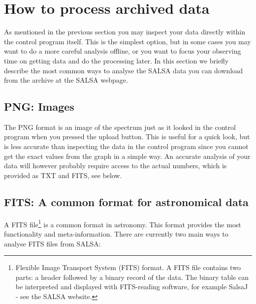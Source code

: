 \section{How to process archived data}
\label{sect:archiveprocess}
As mentioned in the previous section you may inspect your data directly within
the control program itself. This is the simplest option, but in some cases you
may want to do a more careful analysis offline, or you want to focus your 
observing time on getting data and do the processing later. In this section we 
briefly describe the most common ways to analyse the SALSA data you can download
from the archive at the SALSA webpage. 

\subsection{PNG: Images}
The PNG format is an image of the spectrum just as it looked in the control
program when you pressed the upload button. This is useful for a quick look,
but is less accurate than inspecting the data in the control program since you
cannot get the exact values from the graph in a simple way.  An accurate
analysis of your data will however probably require access to the actual
numbers, which is provided as TXT and FITS, see below.

\subsection{FITS: A common format for astronomical data}
A FITS file\footnote{Flexible Image Transport System (FITS) format.  A FITS
file contains two parts: a header followed by a binary record of the data.  The
binary table can be interpreted and displayed with FITS-reading software, for
example SalsaJ - see the SALSA website.} is a common format in astronomy.
This format provides the most functionality and meta-information. There are currently
two main ways to analyse FITS files from SALSA:

